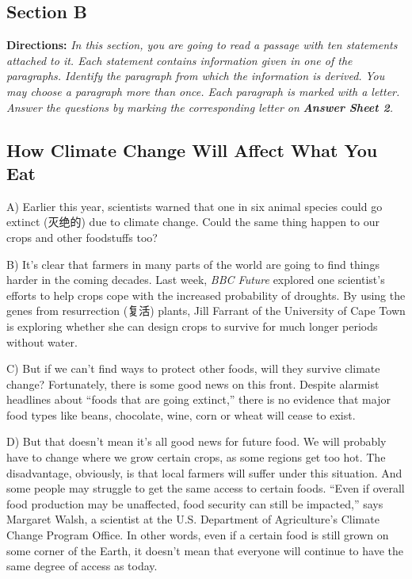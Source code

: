 \documentclass[UTF8,11pt]{ctexart}
\begin{document}
\subsection*{\textbf{Section B}}


\textbf{Directions:} \textit{In this section, you are going to read a passage with ten statements attached to it. Each statement} \textit{contains information given in one of the paragraphs. Identify the paragraph from which the information is derived.} \textit{You may choose a paragraph more than once. Each paragraph is marked with a letter. Answer the questions by} \textit{marking the corresponding letter on }\textbf{\textit{Answer Sheet 2}}\textit{.}


\subsection*{\textbf{How Climate Change Will Affect What You Eat}}


A) Earlier this year, scientists warned that one in six animal species could go extinct (灭绝的) due to climate change. Could the same thing happen to our crops and other foodstuffs too?


B) It’s clear that farmers in many parts of the world are going to find things harder in the coming decades. Last week, \textit{BBC Future} explored one scientist’s efforts to help crops cope with the increased probability of droughts. By using the genes from resurrection (复活) plants, Jill Farrant of the University of Cape Town is exploring whether she can design crops to survive for much longer periods without water.


C) But if we can’t find ways to protect other foods, will they survive climate change? Fortunately, there is some good news on this front. Despite alarmist headlines about “foods that are going extinct,” there is no evidence that major food types like beans, chocolate, wine, corn or wheat will cease to exist.


D) But that doesn’t mean it’s all good news for future food. We will probably have to change where we grow certain crops, as some regions get too hot. The disadvantage, obviously, is that local farmers will suffer under this situation. And some people may struggle to get the same access to certain foods. “Even if overall food production may be unaffected, food security can still be impacted,” says Margaret Walsh, a scientist at the U.S. Department of Agriculture’s Climate Change Program Office. In other words, even if a certain food is still grown on some corner of the Earth, it doesn’t mean that everyone will continue to have the same degree of access as today.
\end{document}
